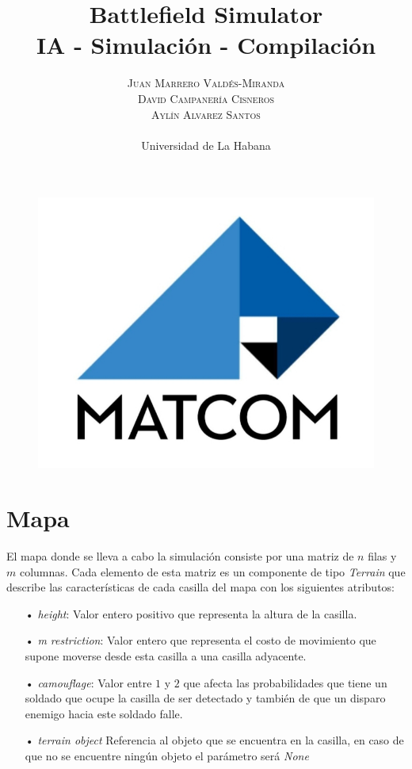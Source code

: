 \documentclass[twoside]{article}
\title{
		{\Huge Battlefield Simulator}
		\\
		{\Large IA - Simulación - Compilación}
	} %
\author{
		\large
		\textsc{Juan Marrero Vald\'es-Miranda}\\ \textsc{David Campanería Cisneros}\\ \textsc{Ayl\'in Alvarez Santos}\\ \\ %
		\normalsize Universidad de La Habana \\ %
		\normalsize 
		\vspace{-5mm}
	}
\date{}
\begin{document}
		
		\maketitle %
		
		\thispagestyle{fancy} %
		\vspace{5cm}
		\begin{figure}
			\centering
			\includegraphics[scale=0.3]{logo-matcom}
		\end{figure}
		\vspace{5cm}
		\newpage
		\tableofcontents
		\newpage
		
\section{Mapa}

El mapa donde se lleva a cabo la simulaci\'on consiste por una matriz de $n$ filas y $m$ columnas. Cada elemento de esta matriz es un componente de tipo \emph{Terrain} que describe las caracter\'isticas de cada casilla del mapa con los siguientes atributos:\\

\begin{itemize}
	\item[•] \emph{height}: Valor entero positivo que representa la altura de la casilla.
	\item[•] \emph{m restriction}: Valor entero que representa el costo de movimiento que supone moverse desde esta casilla a una casilla adyacente.
	\item[•] \emph{camouflage}: Valor entre $1$ y $2$ que afecta las probabilidades que tiene un soldado que ocupe la casilla de ser detectado y tambi\'en de que un disparo enemigo hacia este soldado falle.
	\item[•] \emph{terrain object} Referencia al objeto que se encuentra en la casilla, en caso de que no se encuentre ning\'un objeto el par\'ametro ser\'a \emph{None}
	
\end{itemize}
\end{document}

